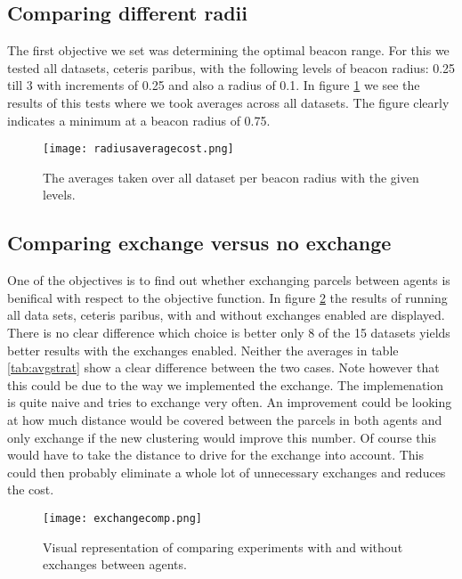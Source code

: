 \documentclass[../main.tex]{subfiles}
\begin{document}
\subsection{Comparing different radii}
The first objective we set was determining the optimal beacon range.
For this we tested all datasets, ceteris paribus, with the following levels of beacon radius: 0.25 till 3 with increments of 0.25 and also a radius of 0.1.
In figure \ref{fig:rad} we see the results of this tests where we took averages across all datasets.
The figure clearly indicates a minimum at a beacon radius of 0.75.
\begin{figure}
	\centering
	\texttt{[image: radiusaveragecost.png]}
	\caption{The averages taken over all dataset per beacon radius with the given levels.}
	\label{fig:rad}
\end{figure}

\subsection{Comparing exchange versus no exchange}
One of the objectives is to find out whether exchanging parcels between agents is benifical with respect to the objective function.
In figure \ref{fig:exch} the results of running all data sets, ceteris paribus, with and without exchanges enabled are displayed.
There is no clear difference which choice is better only 8 of the 15 datasets yields better results with the exchanges enabled.
Neither the averages in table \ref{tab:avgstrat} show a clear difference between the two cases.
Note however that this could be due to the way we implemented the exchange.
The implemenation is quite naive and tries to exchange very often.
An improvement could be looking at how much distance would be covered between the parcels in both agents and only exchange if the new clustering would improve this number.
Of course this would have to take the distance to drive for the exchange into account.
This could then probably eliminate a whole lot of unnecessary exchanges and reduces the cost.

\begin{figure}
	\centering
	\texttt{[image: exchangecomp.png]}
	\caption{Visual representation of comparing experiments with and without exchanges between agents.}
	\label{fig:exch}
\end{figure}
\end{document}
